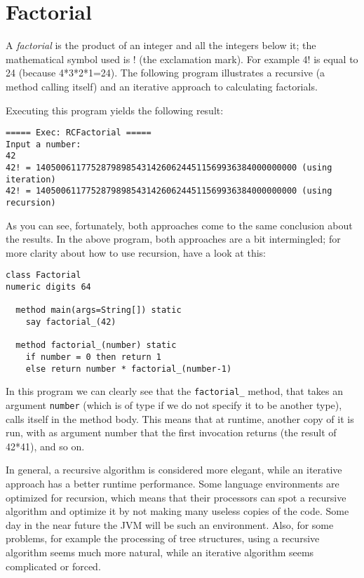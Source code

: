 {\section{Factorial}
A \emph{factorial} is the product of an integer and all the integers
below it; the mathematical symbol used is ! (the exclamation mark). For
example 4! is equal to 24 (because 4*3*2*1=24). The
following program illustrates a recursive (a method calling itself)
and an iterative approach to calculating factorials.

Executing this program yields the following result:
\begin{verbatim}
===== Exec: RCFactorial =====
Input a number: 
42
42! = 1405006117752879898543142606244511569936384000000000 (using iteration)
42! = 1405006117752879898543142606244511569936384000000000 (using recursion)
\end{verbatim}
As you can see, fortunately, both approaches come to the same
conclusion about the results. In the above program, both
approaches are a bit intermingled; for more clarity about how to use
recursion, have a look at this:
\begin{lstlisting}[label=factorialrecursive, caption=Factorial Recursive]
class Factorial
numeric digits 64

  method main(args=String[]) static
    say factorial_(42)

  method factorial_(number) static
    if number = 0 then return 1
    else return number * factorial_(number-1)

\end{lstlisting}
In this program we can clearly see that the \texttt{factorial\_} method, that
takes an argument \texttt{number} (which is of type \Rexx{} if we do not
specify it to be another type), calls itself in the method body. This
means that at runtime, another copy of it is run, with as argument
number that the first invocation returns (the result of 42*41), and so
on.

In general, a recursive algorithm is considered more elegant, while an
iterative approach has a better runtime performance. Some language
environments are optimized for recursion, which means that their
processors can spot a recursive algorithm and optimize it by not
making many useless copies of the code. Some day in the near future
the JVM will be such an environment. Also, for some problems, for example
the processing of tree structures, using a recursive algorithm seems
much more natural, while an iterative algorithm seems complicated or forced.
}
